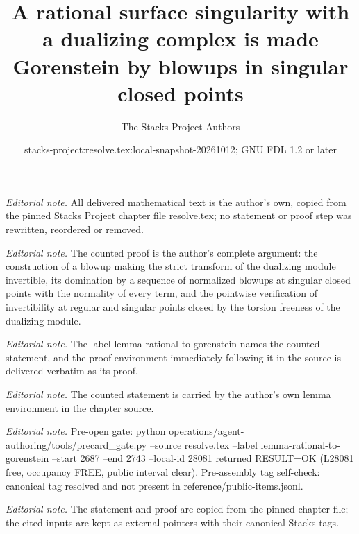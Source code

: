 \documentclass[10pt,a4paper]{amsart}
\title{A rational surface singularity with a dualizing complex is made Gorenstein by blowups in singular closed points}
\author{The Stacks Project Authors}
\date{stacks-project:resolve.tex:local-snapshot-20261012; GNU FDL 1.2 or later}
\theoremstyle{plain}
\theoremstyle{definition}
\theoremstyle{remark}
\numberwithin{equation}{subsection}
\begin{document}
\maketitle
\noindent\textit{Editorial note.} All delivered mathematical text is the author's own, copied from the pinned Stacks Project chapter file resolve.tex; no statement or proof step was rewritten, reordered or removed.\par\medskip
\noindent\textit{Editorial note.} The counted proof is the author's complete argument: the construction of a blowup making the strict transform of the dualizing module invertible, its domination by a sequence of normalized blowups at singular closed points with the normality of every term, and the pointwise verification of invertibility at regular and singular points closed by the torsion freeness of the dualizing module.\par\medskip
\noindent\textit{Editorial note.} The label lemma-rational-to-gorenstein names the counted statement, and the proof environment immediately following it in the source is delivered verbatim as its proof.\par\medskip
\noindent\textit{Editorial note.} The counted statement is carried by the author's own lemma environment in the chapter source.\par\medskip
\noindent\textit{Editorial note.} Pre-open gate: python operations/agent-authoring/tools/precard\_gate.py --source resolve.tex --label lemma-rational-to-gorenstein --start 2687 --end 2743 --local-id 28081 returned RESULT=OK (L28081 free, occupancy FREE, public interval clear). Pre-assembly tag self-check: canonical tag resolved and not present in reference/public-items.jsonl.\par\medskip
\noindent\textit{Editorial note.} The statement and proof are copied from the pinned chapter file; the cited inputs are kept as external pointers with their canonical Stacks tags.\par\medskip
\end{document}

